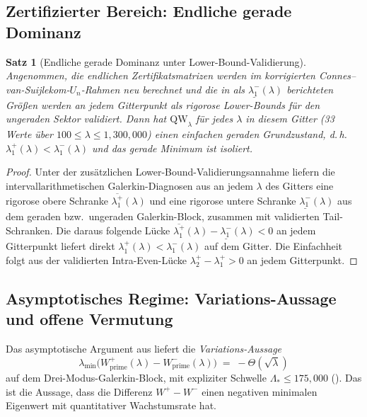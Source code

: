\documentclass[11pt,a4paper]{article}
\newtheorem{theorem}{Satz}[section]
\theoremstyle{remark}
\theoremstyle{plain}
\newcommand{\QW}{\mathrm{QW}}
\begin{document}
\subsection{Zertifizierter Bereich: Endliche gerade Dominanz}

\begin{theorem}[Endliche gerade Dominanz unter Lower-Bound-Validierung]
\label{thm:even-finite}
Angenommen, die endlichen Zertifikatsmatrizen werden im korrigierten Connes--van-Suijlekom-$U_n$-Rahmen neu berechnet und die in  als $\underline{\lambda_1^-}(\lambda)$ berichteten Größen werden an jedem Gitterpunkt als rigorose Lower-Bounds für den ungeraden Sektor validiert. Dann hat $\QW_\lambda$ für jedes $\lambda$ in diesem Gitter (33 Werte über $100\leq\lambda\leq 1{,}300{,}000$) einen einfachen geraden Grundzustand, d.\,h.\ $\lambda_1^+(\lambda)<\lambda_1^-(\lambda)$ und das gerade Minimum ist isoliert.
\end{theorem}

\begin{proof}
Unter der zusätzlichen Lower-Bound-Validierungsannahme liefern die intervallarithmetischen Galerkin-Diagnosen aus  an jedem $\lambda$ des Gitters eine rigorose obere Schranke $\overline{\lambda_1^+}(\lambda)$ und eine rigorose untere Schranke $\underline{\lambda_1^-}(\lambda)$ aus dem geraden bzw.\ ungeraden Galerkin-Block, zusammen mit validierten Tail-Schranken. Die daraus folgende Lücke $\overline{\lambda_1^+}(\lambda)-\underline{\lambda_1^-}(\lambda)<0$ an jedem Gitterpunkt liefert direkt $\lambda_1^+(\lambda)<\lambda_1^-(\lambda)$ auf dem Gitter. Die Einfachheit folgt aus der validierten Intra-Even-Lücke $\lambda_2^+-\lambda_1^+>0$ an jedem Gitterpunkt.
\end{proof}

\subsection{Asymptotisches Regime: Variations-Aussage und offene Vermutung}

Das asymptotische Argument aus  liefert die \emph{Variations-Aussage}
\begin{equation}\label{eq:variational-result}
  \lambda_{\min}\bigl(W^+_{\mathrm{prime}}(\lambda)-W^-_{\mathrm{prime}}(\lambda)\bigr) \;=\; -\Theta(\sqrt\lambda)
\end{equation}
auf dem Drei-Modus-Galerkin-Block, mit expliziter Schwelle $\Lambda_*\leq 175{,}000$ (). Das ist die Aussage, dass die Differenz $W^+-W^-$ einen negativen minimalen Eigenwert mit quantitativer Wachstumsrate hat.
\end{document}
